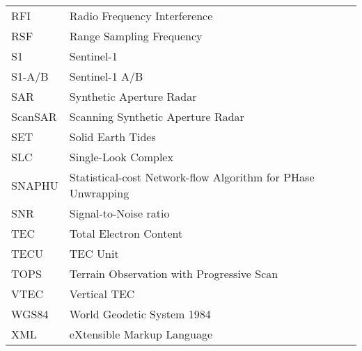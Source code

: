 \begin{longtable}{ll}
RFI & Radio Frequency Interference \\
RSF & Range Sampling Frequency \\
S1 & Sentinel-1 \\
S1-A/B & Sentinel-1 A/B \\
SAR & Synthetic Aperture Radar \\
ScanSAR & Scanning Synthetic Aperture Radar \\
SET & Solid Earth Tides \\
SLC & Single-Look Complex \\
SNAPHU & Statistical-cost Network-flow Algorithm for PHase Unwrapping \\
SNR & Signal-to-Noise ratio \\
TEC & Total Electron Content \\
TECU & TEC Unit \\
TOPS & Terrain Observation with Progressive Scan \\
VTEC & Vertical TEC \\
WGS84 & World Geodetic System 1984 \\
XML & eXtensible Markup Language \\
\end{longtable}